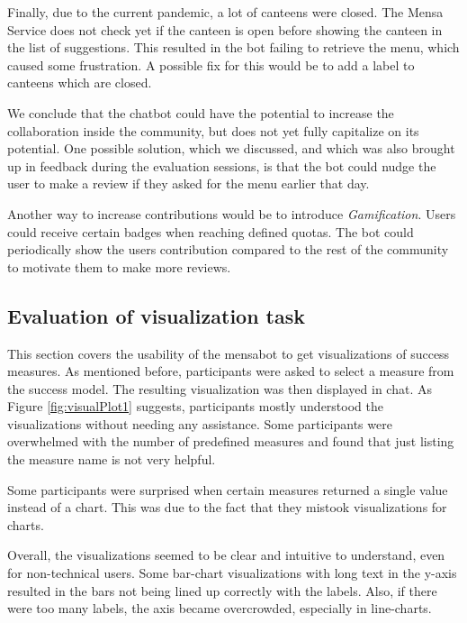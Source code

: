 Finally, due to the current pandemic, a lot of canteens were closed. The Mensa Service does not check yet if the canteen is open before showing the canteen in the list of suggestions. This resulted in the bot failing to retrieve the menu, which caused some frustration. A possible fix for this would be to add a label to canteens which are closed. 




We conclude that the chatbot could have the potential to increase the collaboration inside the community, but does not yet fully capitalize on its potential. One possible solution, which we discussed, and which was also brought up in feedback during the evaluation sessions, is that the bot could nudge the user to make a review if they asked for the menu earlier that day.

Another way to increase contributions would be to introduce \emph{Gamification}. Users could receive certain badges when reaching defined quotas. The bot could periodically show the users contribution compared to the rest of the community to motivate them to make more reviews.

\subsection{Evaluation of visualization task}

This section covers the usability of the mensabot to get visualizations of success measures. As mentioned before, participants were asked to select a measure from the success model. The resulting visualization was then displayed in chat. As Figure \ref{fig:visualPlot1} suggests, participants mostly understood the visualizations without needing any assistance. Some participants were overwhelmed with the number of predefined measures and found that just listing the measure name is not very helpful. 

Some participants were surprised when certain measures returned a single value instead of a chart. This was due to the fact that they mistook visualizations for charts. 



Overall, the visualizations seemed to be clear and intuitive to understand, even for non-technical users. Some bar-chart visualizations with long text in the y-axis resulted in the bars not being  lined up correctly with the labels. Also, if there were too many labels, the axis became overcrowded, especially in line-charts.

